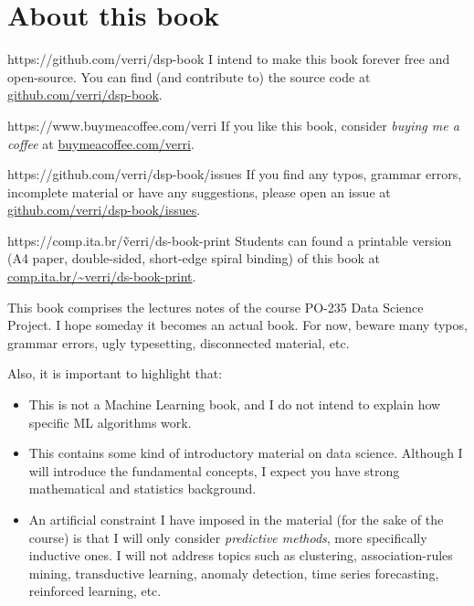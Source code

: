 \chapter*{About this book}

\begin{parwithqr}{https://github.com/verri/dsp-book}
  I intend to make this book forever free and open-source. You can find (and contribute
  to) the source code at \href{\aurl}{github.com/verri/dsp-book}.
\end{parwithqr}

\vfill

\begin{parwithqr}{https://www.buymeacoffee.com/verri}
  If you like this book, consider \emph{buying me a coffee} at
  \href{\aurl}{buymeacoffee.com/verri}.
\end{parwithqr}

\vfill

\begin{parwithqr}{https://github.com/verri/dsp-book/issues}
  If you find any typos, grammar errors, incomplete material or have any suggestions,
  please open an issue at \href{\aurl}{github.com/verri/dsp-book/issues}.
\end{parwithqr}

\vfill

\begin{parwithqr}{https://comp.ita.br/\~verri/ds-book-print}
  Students can found a printable version (A4 paper, double-sided, short-edge spiral
  binding) of this book at \href{\aurl}{comp.ita.br/\textasciitilde{}verri/ds-book-print}.
\end{parwithqr}

\newpage
This book comprises the lectures notes of the course PO-235 Data Science Project.
I hope someday it becomes an actual book. For now, beware many typos, grammar errors, ugly
typesetting, disconnected material, etc.

Also, it is important to highlight that:
\begin{itemize}
  \item This is not a Machine Learning book, and I do not intend to explain how specific
    ML algorithms work.
  \item This contains some kind of introductory material on data science.  Although I will
    introduce the fundamental concepts, I expect you have strong mathematical and
    statistics background.
  \item An artificial constraint I have imposed in the material (for the sake of the
    course) is that I will only consider \emph{predictive methods}, more specifically
    inductive ones. I will not address topics such as clustering, association-rules
    mining, transductive learning, anomaly detection, time series forecasting, reinforced
    learning, etc.
\end{itemize}

